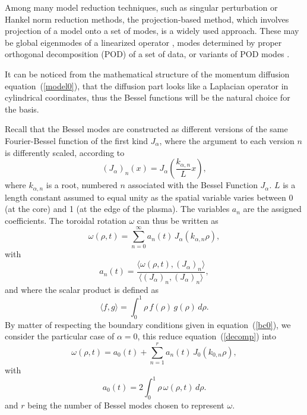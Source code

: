\documentclass[12pt]{iopart}
\begin{document}
Among many model reduction techniques, such as singular perturbation or Hankel norm reduction methods, the projection-based method, which involves projection of a model onto a set of modes, is a widely used approach. These may be global eigenmodes of a linearized operator \cite{Akervik07}, modes determined by proper orthogonal decomposition (POD) of a set of data, or variants of POD modes \cite{Holmes97}. 

It can be noticed from the mathematical structure of the momentum diffusion equation~(\ref{model0}), that the diffusion part looks like a Laplacian operator in cylindrical coordinates, thus the Bessel functions will be the natural choice for the basis. 

Recall that the Bessel modes are constructed as different versions of the same Fourier-Bessel function of the first kind $J_{\alpha}$, where the argument to each version $n$ is differently scaled, according to
\begin{equation}
(J_{\alpha})_n (x) = J_{\alpha} \left(  \frac{ k_{\alpha,n}}{L} x \right),
\label{defmod}
\end{equation}
where $ k_{\alpha,n}$ is a root, numbered $n$ associated with the Bessel Function $J_{\alpha}$. $L$ is a length constant assumed to equal unity as the spatial variable varies between 0 (at the core) and 1 (at the edge of the plasma). The variables $a_n$ are the assigned coefficients. The toroidal rotation $\omega$ can thus be written as 
\begin{equation}
\omega(\rho,t)  = \sum_{n=0}^{\infty} a_n(t) \, J_{\alpha} \left( { k_{\alpha,n}} \rho \right),
\label{decomp}
\end{equation}
 with
 \begin{equation}
a_n(t) = \frac{\langle \omega(\rho,t), \left(J_{\alpha} \right)_n \rangle }{\langle  \left(J_{\alpha} \right)_n ,  \left(J_{\alpha} \right)_n   \rangle},
\end{equation}
and where the scalar product is defined as 
\begin{equation}
\langle f,g \rangle =   \int^1 _0 \rho \, f(\rho) \, g(\rho) \, d\rho.
\end{equation}
By matter of respecting the boundary conditions given in equation~(\ref{bc0}), we consider the particular case of $\alpha = 0$, this reduce equation~(\ref{decomp}) into
\begin{equation}
\omega(\rho,t)  = a_0(t) + \sum_{n=1}^{r} a_n(t) \, J_{0} \left(  k_{0,n} \rho \right),
\end{equation}
with
\begin{equation}
a_0 (t) = {2} \int^1 _0 \rho \, \omega(\rho,t) \, d\rho.
\end{equation}
and $r$ being the number of Bessel modes chosen to represent $\omega$.
\end{document}
